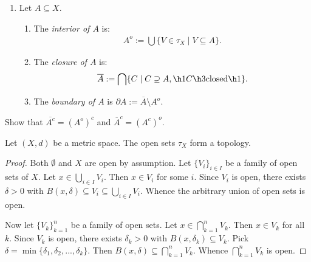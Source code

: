 \begin{definition}
\begin{enumerate}[label = (\arabic*),itemsep=1pt,topsep=3pt]
                \item Let $A \subseteq X$.
                    \begin{enumerate}[label = (\roman*),itemsep=1pt,topsep=3pt]
                        \item The \textit{interior of $A$} is:
                            \begin{equation*}
                            \begin{split}
                                A^o := \bigcup \{V \in \tau_X \mid V \subseteq A\}.
                            \end{split}
                            \end{equation*}
                        \item The \textit{closure of $A$} is:
                            \begin{equation*}
                            \begin{split}
                                \overline{A}:= \bigcap \{C \mid C \supseteq A, \h1C \h3\text{closed}\h1\}.
                            \end{split}
                            \end{equation*}
                        \item The \textit{boundary of $A$} is $\partial A := \overline{A}\setminus A^o$.
                    \end{enumerate}
            \end{enumerate}
    \end{definition}

    \begin{exercise}
        Show that $\overline{A^c} = (A^o)^c$ and $\overline{A}^c = (A^c)^o$.
    \end{exercise}

    \begin{proposition}
        Let $(X,d)$ be a metric space. The open sets $\tau_X$ form a topology.
    \end{proposition}
        \begin{proof}
            Both $\emptyset$ and $X$ are open by assumption. Let $\{V_i\}_{i \in I}$ be a family of open sets of $X$. Let $x \in \bigcup_{i \in I} V_i$. Then $x \in V_i$ for some $i$. Since $V_i$ is open, there exists $\delta>0$ with $B(x,\delta) \subseteq V_i \subseteq \bigcup_{i \in I}V_i$. Whence the arbitrary union of open sets is open.
            
            Now let $\{V_k\}_{k = 1}^n$ be a family of open sets. Let $x \in \bigcap_{k = 1}^n V_k$. Then $x \in V_k$ for all $k$. Since $V_k$ is open, there exists $\delta_k > 0$ with $B(x,\delta_k) \subseteq V_k$. Pick $\delta = \min\{\delta_1,\delta_2,...,\delta_k\}$. Then $B(x,\delta) \subseteq \bigcap_{k = 1}^n V_k$. Whence $\bigcap_{k = 1}^n V_k$ is open.
        \end{proof}
    
